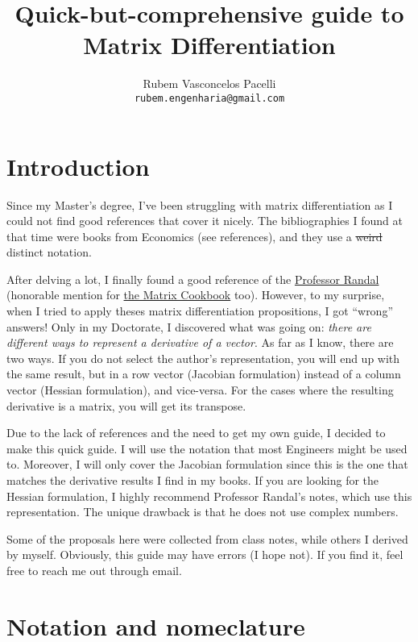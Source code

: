 \documentclass{article}
\title{\textbf{Quick-but-comprehensive guide to Matrix Differentiation}  \vspace{-.3cm}}
\author{Rubem Vasconcelos Pacelli\\
  {\tt rubem.engenharia@gmail.com}}
\affil{Department of Teleinformatics Engineering, Federal University of Ceará.\\Fortaleza, Ceará, Brazil. \vspace{-.5cm}}
\begin{document}
\maketitle
\tableofcontents

\section{Introduction}
Since my Master's degree, I've been struggling with matrix differentiation as I could not find good references that cover it nicely. The bibliographies I found at that time were books from Economics (see references), and they use a \st{weird} distinct notation.

After delving a lot, I finally found a good reference of the \href{https://atmos.washington.edu/~dennis/MatrixCalculus.pdf}{Professor Randal} (honorable mention for \href{https://www.math.uwaterloo.ca/~hwolkowi/matrixcookbook.pdf}{the Matrix Cookbook} too). However, to my surprise, when I tried to apply theses matrix differentiation propositions, I got ``wrong'' answers! Only in my Doctorate, I discovered what was going on: \emph{there are different ways to represent a derivative of a vector}. As far as I know, there are two ways. If you do not select the author's representation, you will end up with the same result, but in a row vector (Jacobian formulation) instead of a column vector (Hessian formulation), and vice-versa. For the cases where the resulting derivative is a matrix, you will get its transpose.

Due to the lack of references and the need to get my own guide, I decided to make this quick guide. I will use the notation that most Engineers might be used to. Moreover, I will only cover the Jacobian formulation since this is the one that matches the derivative results I find in my books. If you are looking for the Hessian formulation, I highly recommend Professor Randal's notes, which use this representation. The unique drawback is that he does not use complex numbers.

Some of the proposals here were collected from class notes, while others I derived by myself. Obviously, this guide may have errors (I hope not). If you find it, feel free to reach me out through email.

\section{Notation and nomeclature}
\end{document}
